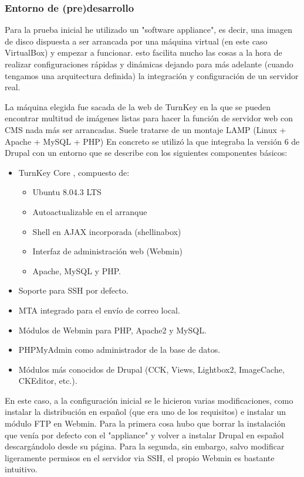 \subsubsection{Entorno de (pre)desarrollo}
\par Para la prueba inicial he utilizado un "software appliance", es decir, una imagen de disco dispuesta a ser arrancada por una máquina virtual (en este caso VirtualBox) y empezar a funcionar. esto facilita mucho las cosas a la hora de realizar configuraciones rápidas y dinámicas dejando para más adelante (cuando tengamos una arquitectura definida) la integración y configuración de un servidor real.

La máquina elegida fue sacada de la web de TurnKey \cite{references:turnkey} en la que se pueden encontrar multitud de imágenes listas para hacer la función de servidor web con CMS nada más ser arrancadas. Suele tratarse de un montaje LAMP (Linux + Apache + MySQL + PHP) \cite{references:LAMP} En concreto se utilizó la que integraba la versión 6 de Drupal \cite{references:turnkeydrupal} con un entorno que se describe con los siguientes componentes básicos:

\begin{itemize}
\item TurnKey Core \cite{references:turnkeycore}, compuesto de:
	\begin{itemize}
	\item Ubuntu 8.04.3 LTS
	\item Autoactualizable en el arranque
	\item Shell en AJAX incorporada (shellinabox\cite{references:shellinabox})
	\item Interfaz de administración web (Webmin\cite{references:webmin})
	\item Apache, MySQL y PHP.
	\end{itemize}
\item Soporte para SSH por defecto.
\item MTA integrado para el envío de correo local.
\item Módulos de Webmin para PHP, Apache2 y MySQL.
\item PHPMyAdmin como administrador de la base de datos.
\item Módulos más conocidos de Drupal (CCK, Views, Lightbox2, ImageCache, CKEditor, etc.).
\end{itemize}

\par En este caso, a la configuración inicial se le hicieron varias modificaciones, como instalar la distribución en español (que era uno de los requisitos) e instalar un módulo FTP en Webmin. Para la primera cosa hubo que borrar la instalación que venía por defecto con el "appliance" y volver a instalar Drupal en español descargándolo desde su página\cite{references:drupalhispano}. Para la segunda, sin embargo, salvo modificar ligeramente permisos en el servidor via SSH, el propio Webmin es bastante intuitivo.

